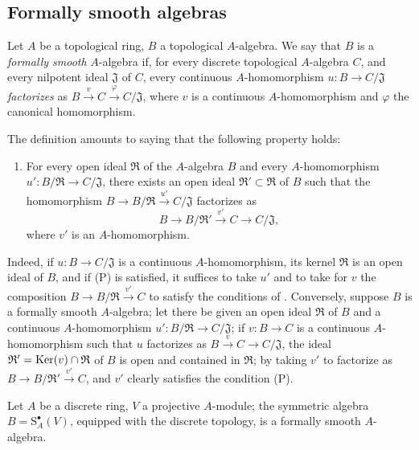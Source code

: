 \subsection{Formally smooth algebras}
\label{subsection:0.19.3}

\begin{definition}[19.3.1]
\label{0.19.3.1}
Let $A$ be a topological ring, $B$ a topological $A$-algebra.
We say that $B$ is a \emph{formally smooth} $A$-algebra if, for every discrete topological $A$-algebra $C$, and every nilpotent ideal $\mathfrak{J}$ of $C$, every continuous $A$-homomorphism $u:B\to C/\mathfrak{J}$ \emph{factorizes} as $B\xrightarrow{v}C\xrightarrow{\varphi}C/\mathfrak{J}$, where $v$ is a continuous $A$-homomorphism and $\varphi$ the canonical homomorphism.
\end{definition}

The definition  amounts to saying that the following property holds:
\begin{enumerate}
  \item[(P)] For every open ideal $\mathfrak{R}$ of the $A$-algebra $B$ and every $A$-homomorphism $u':B/\mathfrak{R}\to C/\mathfrak{J}$, there exists an open ideal $\mathfrak{R}'\subset\mathfrak{R}$ of $B$ such that the homomorphism
  $B\to B/\mathfrak{R}\xrightarrow{u'}C/\mathfrak{J}$ factorizes as
  \[
    B\to B/\mathfrak{R}'\xrightarrow{v'}C\to C/\mathfrak{J},
  \]
  where $v'$ is an $A$-homomorphism.
\end{enumerate}

Indeed, if $u:B\to C/\mathfrak{J}$ is a continuous $A$-homomorphism, its kernel $\mathfrak{R}$ is an open ideal of $B$, and if (P) is satisfied, it suffices to take $u'$ and to take for $v$ the composition $B\to B/\mathfrak{R}\xrightarrow{v'}C$ to satisfy the conditions of .
Conversely, suppose $B$ is a formally smooth $A$-algebra;
let there be given an open ideal $\mathfrak{R}$ of $B$ and a continuous $A$-homomorphism $u':B/\mathfrak{R}\to C/\mathfrak{J}$;
if $v:B\to C$ is a continuous $A$-homomorphism such that $u$ factorizes as $B\xrightarrow{v}C\to C/\mathfrak{J}$, the ideal $\mathfrak{R}'=\operatorname{Ker}(v)\cap\mathfrak{R}$ of $B$ is open and contained in $\mathfrak{R}$;
by taking $v'$ to factorize as $B\to B/\mathfrak{R}'\xrightarrow{v'}C$, and $v'$ clearly satisfies the condition (P).

\begin{proposition}[19.3.2]
\label{0.19.3.2}
Let $A$ be a discrete ring, $V$ a projective $A$-module;
the symmetric algebra $B=\mathrm{S}_A^\bullet(V)$, equipped with the discrete topology, is a formally smooth $A$-algebra.
\end{proposition}

